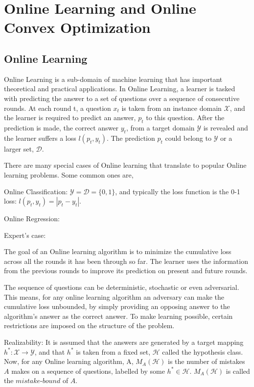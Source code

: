 

%


\chapter{Online Learning and Online Convex Optimization}

\section{Online Learning}

Online Learning is a sub-domain of machine learning that has important theoretical and practical applications. 
In Online Learning, a learner is tasked with predicting the answer to a set of questions over a sequence of consecutive rounds.
At each round t, a question $x_t$ is taken from an instance domain $\mathcal{X}$, and the learner is required to predict 
an answer, $p_t$ to this question. After the prediction is made, the correct answer $y_t$, from a target domain $\mathcal{Y}$ 
is revealed and the learner suffers a loss $l(p_t, y_t)$. The prediction $p_t$ could belong to $\mathcal{Y}$ or a larger set, 
$\mathcal{D}$.

There are many special cases of Online learning that translate to popular Online learning problems. Some common ones are,

Online Classification: $\mathcal{Y}=\mathcal{D}=\{0,1\}$, and typically the loss function is the 0-1 loss: $l(p_t, y_t)=|p_t - y_t|$.

Online Regression:

Expert's case:


The goal of an Online learning algorithm is to minimize the cumulative loss across all the rounds it has been through so far.
The learner uses the information from the previous rounds to improve its prediction on present and future rounds.

The sequence of questions can be deterministic, stochastic or even adversarial. This means, for any online learning algorithm 
an adversary can make the cumulative loss unbounded, by simply providing an opposing answer to the algorithm's answer as the correct 
answer. To make learning possible, certain restrictions are imposed on the structure of the problem.

Realizability: It is assumed that the answers are generated by a target mapping $h^*: \mathcal{X} \rightarrow \mathcal{Y}$, and that $h^*$ is 
taken from a fixed set, $\mathcal{H}$ called the hypothesis class. Now, for any Online learning algorithm, A, $M_A(\mathcal{H})$ is the number 
of mistakes $A$ makes on a sequence of questions, labelled by some $h^* \in \mathcal{H}$. $M_A(\mathcal{H})$ is called the $\textit{mistake-bound}$ 
of $A$.

